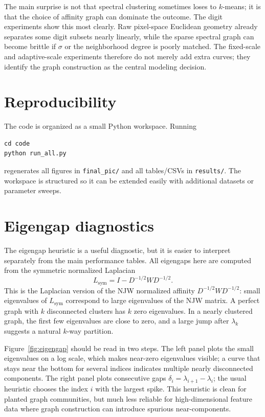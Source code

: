 \documentclass[11pt]{article}
\theoremstyle{plain}
\theoremstyle{definition}
\begin{document}
The main surprise is not that spectral clustering sometimes loses to $k$-means; it is that the choice of affinity graph can dominate the outcome. The digit experiments show this most clearly. Raw pixel-space Euclidean geometry already separates some digit subsets nearly linearly, while the sparse spectral graph can become brittle if $\sigma$ or the neighborhood degree is poorly matched. The fixed-scale and adaptive-scale experiments therefore do not merely add extra curves; they identify the graph construction as the central modeling decision.

\section{Reproducibility}
The code is organized as a small Python workspace. Running
\begin{verbatim}
cd code
python run_all.py
\end{verbatim}
regenerates all figures in \texttt{final\_pic/} and all tables/CSVs in \texttt{results/}. The workspace is structured so it can be extended easily with additional datasets or parameter sweeps.

\appendix

\section{Eigengap diagnostics}
The eigengap heuristic is a useful diagnostic, but it is easier to interpret separately from the main performance tables. All eigengaps here are computed from the symmetric normalized Laplacian
\[
L_{\mathrm{sym}} = I - D^{-1/2}WD^{-1/2}.
\]
This is the Laplacian version of the NJW normalized affinity $D^{-1/2}WD^{-1/2}$: small eigenvalues of $L_{\mathrm{sym}}$ correspond to large eigenvalues of the NJW matrix. A perfect graph with $k$ disconnected clusters has $k$ zero eigenvalues. In a nearly clustered graph, the first few eigenvalues are close to zero, and a large jump after $\lambda_k$ suggests a natural $k$-way partition.

Figure~\ref{fig:eigengap} should be read in two steps. The left panel plots the small eigenvalues on a log scale, which makes near-zero eigenvalues visible; a curve that stays near the bottom for several indices indicates multiple nearly disconnected components. The right panel plots consecutive gaps $\delta_i=\lambda_{i+1}-\lambda_i$; the usual heuristic chooses the index $i$ with the largest spike. This heuristic is clean for planted graph communities, but much less reliable for high-dimensional feature data where graph construction can introduce spurious near-components.
\end{document}
